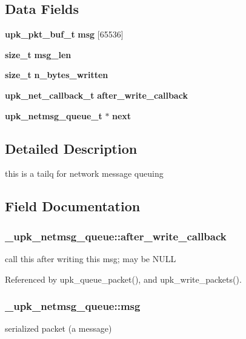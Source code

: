 \subsection*{Data Fields}
\begin{DoxyCompactItemize}
\item 
{\bf upk\_\-pkt\_\-buf\_\-t} {\bf msg} [65536]
\item 
{\bf size\_\-t} {\bf msg\_\-len}
\item 
{\bf size\_\-t} {\bf n\_\-bytes\_\-written}
\item 
{\bf upk\_\-net\_\-callback\_\-t} {\bf after\_\-write\_\-callback}
\item 
{\bf upk\_\-netmsg\_\-queue\_\-t} $\ast$ {\bf next}
\end{DoxyCompactItemize}


\subsection{Detailed Description}
this is a tailq for network message queuing 

\subsection{Field Documentation}
\subsubsection[{after\_\-write\_\-callback}]{ {\bf \_\-upk\_\-netmsg\_\-queue::after\_\-write\_\-callback}}\label{struct__upk__netmsg__queue_ac08757fcf4cb2cf80d69d4aaa47f0dba}
call this after writing this msg; may be NULL 

Referenced by upk\_\-queue\_\-packet(), and upk\_\-write\_\-packets().

\subsubsection[{msg}]{ {\bf \_\-upk\_\-netmsg\_\-queue::msg}}\label{struct__upk__netmsg__queue_a64bd48d1e45dcba5cfe2966bb160bab3}
serialized packet (a message) 

